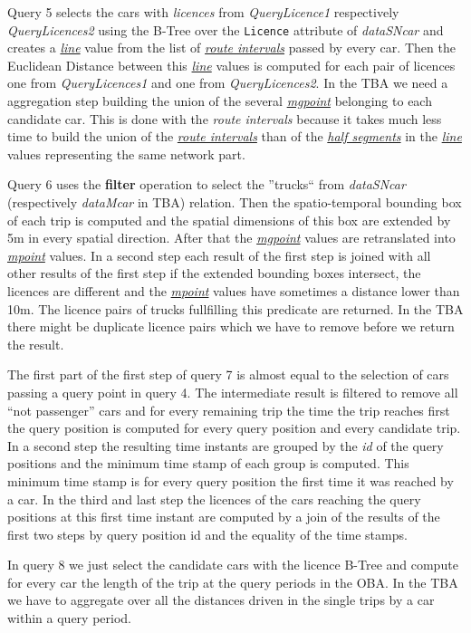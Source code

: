 \documentclass[a4paper]{article}
\newcommand{\op}[1]{\textbf{#1}}
\newcommand{\var}[1]{\textsl{#1}}
\newcommand{\dt}[1]{\textsl{\underline{#1}}}
\begin{document}
{Query 5 selects the cars with \var{licences} from \var{QueryLicence1} respectively \var{QueryLicences2} using the B-Tree over the \texttt{Licence} attribute of \var{dataSNcar} and creates a \dt{line} value from the list of \dt{route intervals} passed by every car. Then the Euclidean Distance between this \dt{line} values is computed for each pair of licences one from \var{QueryLicences1} and one from \var{QueryLicences2}. In the TBA we need a aggregation step building the union of the several \dt{mgpoint} belonging to each candidate car. This is done with the \var{route intervals} because it takes much less time to build the union of the \dt{route intervals} than of the \dt{half segments} in the \dt{line} values representing the same network part.

Query 6 uses the \op{filter} operation to select the ''trucks`` from \var{dataSNcar} (respectively \var{dataMcar} in TBA) relation. Then the spatio-temporal bounding box of each trip is computed and the spatial dimensions of this box are extended by 5m in every spatial direction. After that the \dt{mgpoint} values are retranslated into \dt{mpoint} values. In a second step each result of the first step is joined with all other results of the first step if the extended bounding boxes intersect, the licences are different and the \dt{mpoint} values have sometimes a distance lower than 10m. The licence pairs of trucks fullfilling this predicate are returned. In the TBA there might be duplicate licence pairs which we have to remove before we return the result.

The first part of the first step of query 7 is almost equal to the selection of cars passing a query point in query 4. The intermediate result is filtered to remove all ``not passenger'' cars and for every remaining trip the time the trip reaches first the query position is computed for every query position and every candidate trip. In a second step the resulting time instants are grouped by the \var{id} of the query positions and the minimum time stamp of each group is computed. This minimum time stamp is for every query position the first time it was reached by a car. In the third and last step the licences of the cars reaching the query positions at this first time instant are computed by a join of the results of the first two steps by query position id and the equality of the time stamps.

In query 8 we just select the candidate cars with the licence B-Tree and compute for every car the length of the trip at the query periods in the OBA. In the TBA we have to aggregate over all the distances driven in the single trips by a car within a query period.

}
\end{document}
